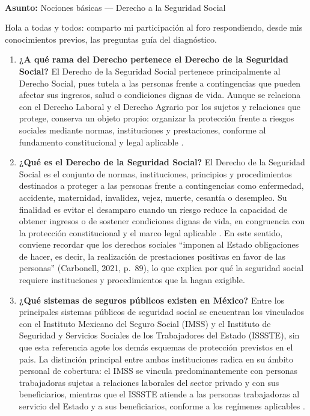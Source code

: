 \documentclass[12pt,letterpaper,oneside]{article}
\newcommand{\foroCopyButton}[1]{%
  \textattachfile[appearance={},description={Participacion del foro (texto copiable)},mimetype=text/plain]{#1}{%
    \colorbox{unadmGreen}{\small\textcolor{white}{\,Copiar participación\,}}%
  }%
}
\begin{document}
\begin{forobox}[title={Intervención en el foro sobre seguridad social}]
\hfill\foroCopyButton{foro-participacion-Actividad-1.txt}\\[-0.5em]
\label{foro-participacion}

\textbf{Asunto:} Nociones básicas — Derecho a la Seguridad Social\par
\medskip
Hola a todas y todos: comparto mi participación al foro respondiendo, desde mis conocimientos previos, las preguntas guía del diagnóstico.
\medskip

\begin{enumerate}[leftmargin=1.6em,labelsep=0.6em,itemsep=0.5em,label=\textbf{\arabic*)}]
  \item \textbf{¿A qué rama del Derecho pertenece el Derecho de la Seguridad Social?} El Derecho de la Seguridad Social pertenece principalmente al Derecho Social, pues tutela a las personas frente a contingencias que pueden afectar sus ingresos, salud o condiciones dignas de vida. Aunque se relaciona con el Derecho Laboral y el Derecho Agrario por los sujetos y relaciones que protege, conserva un objeto propio: organizar la protección frente a riesgos sociales mediante normas, instituciones y prestaciones, conforme al fundamento constitucional y legal aplicable \citep{cpeum2026,lss2026}.

  \item \textbf{¿Qué es el Derecho de la Seguridad Social?} El Derecho de la Seguridad Social es el conjunto de normas, instituciones, principios y procedimientos destinados a proteger a las personas frente a contingencias como enfermedad, accidente, maternidad, invalidez, vejez, muerte, cesantía o desempleo. Su finalidad es evitar el desamparo cuando un riesgo reduce la capacidad de obtener ingresos o de sostener condiciones dignas de vida, en congruencia con la protección constitucional y el marco legal aplicable \citep{cpeum2026,lss2026}. En este sentido, conviene recordar que los derechos sociales ``imponen al Estado obligaciones de hacer, es decir, la realización de prestaciones positivas en favor de las personas'' (Carbonell, 2021, p.~89), lo que explica por qué la seguridad social requiere instituciones y procedimientos que la hagan exigible.

  \item \textbf{¿Qué sistemas de seguros públicos existen en México?} Entre los principales sistemas públicos de seguridad social se encuentran los vinculados con el Instituto Mexicano del Seguro Social (IMSS) y el Instituto de Seguridad y Servicios Sociales de los Trabajadores del Estado (ISSSTE), sin que esta referencia agote los demás esquemas de protección previstos en el país. La distinción principal entre ambas instituciones radica en su ámbito personal de cobertura: el IMSS se vincula predominantemente con personas trabajadoras sujetas a relaciones laborales del sector privado y con sus beneficiarios, mientras que el ISSSTE atiende a las personas trabajadoras al servicio del Estado y a sus beneficiarios, conforme a los regímenes aplicables \citep{imssSitio2026,isssteSitio2026}.


\end{enumerate}
\end{forobox}
\end{document}
